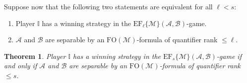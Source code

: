 \documentclass{article}
\newtheorem{theorem}{Theorem}[section]
\theoremstyle{definition}
\begin{document}
Suppose now that the following two statements are equivalent for all $\ell < s$:
\begin{enumerate}
    \item Player $\mathbb{I}$ has a winning strategy in the $\mathrm{EF}_\ell\{\mathcal{M}\}(\mathcal{A},\mathcal{B})$-game.
    \item $\mathcal{A}$ and $\mathcal{B}$ are separable by an $\mathrm{FO}(\mathcal{M})$-formula of quantifier rank $\leq \ell$.
\end{enumerate}

\begin{theorem}
    Player $\mathbb{I}$ has a winning strategy in the $\mathrm{EF}_s\{\mathcal{M}\}(\mathcal{A},\mathcal{B})$-game if and only if $\mathcal{A}$ and $\mathcal{B}$ are separable by an $\mathrm{FO}(\mathcal{M})$-formula of quantifier rank $\leq s$.
\end{theorem}
\end{document}
